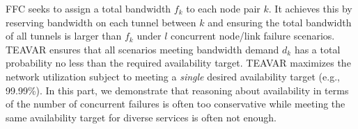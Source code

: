 \documentclass[sigconf]{acmart}
\begin{document}
\iffalse
FFC \cite{FFC} seeks to assign a total bandwidth $f_k$ to each node pair $k$.
It achieves this by reserving bandwidth on each tunnel between $k$ and ensuring the total bandwidth of all tunnels is larger than $f_k$ under $l$ concurrent node/link failure scenarios.
TEAVAR \cite{Teavar} ensures that all scenarios meeting bandwidth demand $d_k$ has a total probability no less than the required availability target.
TEAVAR maximizes the network utilization subject to meeting a \textit{single} desired availability target (e.g., 99.99\%).
In this part, we demonstrate that reasoning about  availability in terms of
the number of concurrent failures is often too conservative while meeting the same availability target for diverse services is often not enough.
\end{document}
